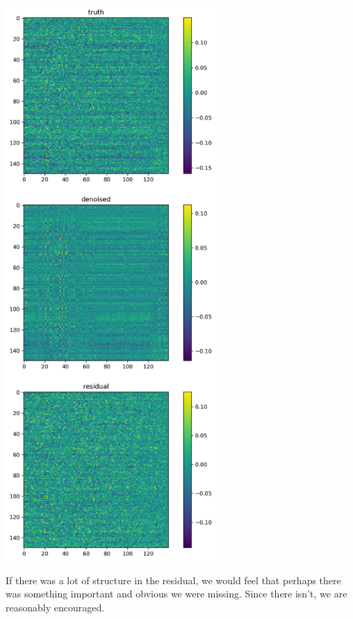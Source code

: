 \includegraphics[width=0.6\textwidth]{pics/residsfull}

If there was a lot of structure in the residual, we would feel that perhaps there was something important and obvious we were missing.  Since there isn't, we are reasonably encouraged.

% 
% 








































